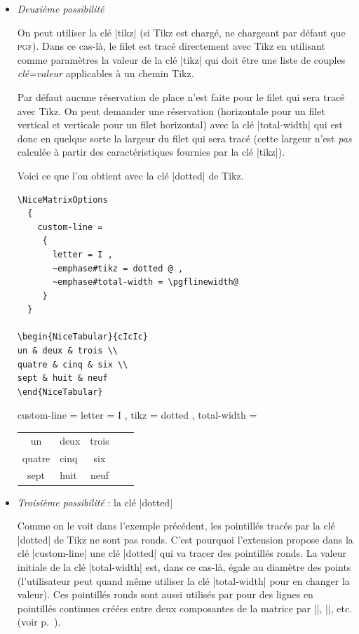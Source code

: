 \documentclass[dvipsnames]{article}%
\begin{document}
\begin{itemize}
\item \emph{Deuxième possibilité}\par\nobreak

On peut utiliser la clé |tikz| (si Tikz est chargé,  ne
chargeant par défaut que \textsc{pgf}). Dans ce cas-là, le filet est tracé
directement avec Tikz en utilisant comme paramètres la valeur de la clé |tikz|
qui doit être une liste de couples \textsl{clé=valeur} applicables à un chemin
Tikz.

Par défaut aucune réservation de place n'est faite pour le filet qui sera tracé
avec Tikz. On peut demander une réservation (horizontale pour un filet vertical
et verticale pour un filet horizontal) avec la clé |total-width| qui est donc en
quelque sorte la largeur du filet qui sera tracé (cette largeur n'est \emph{pas}
calculée à partir des caractéristiques fournies par la clé |tikz|).

\bigskip
Voici ce que l'on obtient avec la clé |dotted| de Tikz.

\begin{Verbatim}
\NiceMatrixOptions
  {
    custom-line = 
     {
       letter = I , 
       ~emphase#tikz = dotted @ ,
       ~emphase#total-width = \pgflinewidth@ 
     }
  }

\begin{NiceTabular}{cIcIc}
un & deux & trois \\
quatre & cinq & six \\
sept & huit & neuf
\end{NiceTabular}
\end{Verbatim}

\begin{center}
\NiceMatrixOptions
  {
    custom-line = 
     {
       letter = I , 
       tikz = dotted ,
       total-width = \pgflinewidth
     }
  }
\begin{NiceTabular}{cIcIc}
un & deux & trois \\
quatre & cinq & six \\
sept & huit & neuf
\end{NiceTabular}
\end{center}

\medskip
\item \emph{Troisième possibilité} : la clé |dotted|\par\nobreak
\label{dotted}

Comme on le voit dans l'exemple précédent, les pointillés tracés par la clé
|dotted| de Tikz ne sont pas ronds. C'est pourquoi l'extension 
propose dans la clé |custom-line| une clé |dotted| qui va tracer des pointillés
ronds. La valeur initiale de la clé |total-width| est, dans ce cas-là, égale au
diamètre des points (l'utilisateur peut quand même utiliser la clé |total-width|
pour en changer la valeur). Ces pointillés ronds sont aussi utilisés par
 pour des lignes en pointillés continues créées entre deux
composantes de la matrice par |\Cdots|, |\Vdots|, etc. (voir
p.~\pageref{Cdots}).


\end{itemize}
\end{document}
